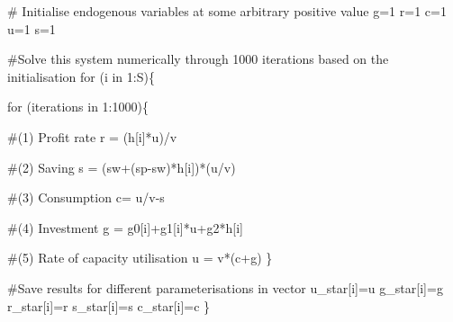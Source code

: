 \documentclass[
  letterpaper,
  DIV=11,
  numbers=noendperiod]{scrreprt}
\newenvironment{Shaded}{\begin{snugshade}}{\end{snugshade}}
\newcommand{\CommentTok}[1]{\textcolor[rgb]{0.37,0.37,0.37}{#1}}
\newcommand{\ControlFlowTok}[1]{\textcolor[rgb]{0.00,0.23,0.31}{#1}}
\newcommand{\DecValTok}[1]{\textcolor[rgb]{0.68,0.00,0.00}{#1}}
\newcommand{\NormalTok}[1]{\textcolor[rgb]{0.00,0.23,0.31}{#1}}
\newcommand{\OtherTok}[1]{\textcolor[rgb]{0.00,0.23,0.31}{#1}}
\newcommand{\SpecialCharTok}[1]{\textcolor[rgb]{0.37,0.37,0.37}{#1}}
\begin{document}
\begin{Shaded}
\begin{Highlighting}[]
\CommentTok{\# Initialise endogenous variables at some arbitrary positive value }
\NormalTok{g}\OtherTok{=}\DecValTok{1}
\NormalTok{r}\OtherTok{=}\DecValTok{1}
\NormalTok{c}\OtherTok{=}\DecValTok{1}
\NormalTok{u}\OtherTok{=}\DecValTok{1}
\NormalTok{s}\OtherTok{=}\DecValTok{1}

\CommentTok{\#Solve this system numerically through 1000 iterations based on the initialisation}
\ControlFlowTok{for}\NormalTok{ (i }\ControlFlowTok{in} \DecValTok{1}\SpecialCharTok{:}\NormalTok{S)\{}
  
  \ControlFlowTok{for}\NormalTok{ (iterations }\ControlFlowTok{in} \DecValTok{1}\SpecialCharTok{:}\DecValTok{1000}\NormalTok{)\{}
    
    \CommentTok{\#(1) Profit rate}
\NormalTok{    r }\OtherTok{=}\NormalTok{ (h[i]}\SpecialCharTok{*}\NormalTok{u)}\SpecialCharTok{/}\NormalTok{v}
    
    \CommentTok{\#(2) Saving}
\NormalTok{    s }\OtherTok{=}\NormalTok{ (sw}\SpecialCharTok{+}\NormalTok{(sp}\SpecialCharTok{{-}}\NormalTok{sw)}\SpecialCharTok{*}\NormalTok{h[i])}\SpecialCharTok{*}\NormalTok{(u}\SpecialCharTok{/}\NormalTok{v)}
    
    \CommentTok{\#(3) Consumption}
\NormalTok{    c}\OtherTok{=}\NormalTok{ u}\SpecialCharTok{/}\NormalTok{v}\SpecialCharTok{{-}}\NormalTok{s}
    
    \CommentTok{\#(4) Investment}
\NormalTok{    g }\OtherTok{=}\NormalTok{ g0[i]}\SpecialCharTok{+}\NormalTok{g1[i]}\SpecialCharTok{*}\NormalTok{u}\SpecialCharTok{+}\NormalTok{g2}\SpecialCharTok{*}\NormalTok{h[i]}
    
    \CommentTok{\#(5) Rate of capacity utilisation}
\NormalTok{    u }\OtherTok{=}\NormalTok{ v}\SpecialCharTok{*}\NormalTok{(c}\SpecialCharTok{+}\NormalTok{g)}
\NormalTok{  \}}
  
  \CommentTok{\#Save results for different parameterisations in vector}
\NormalTok{  u\_star[i]}\OtherTok{=}\NormalTok{u}
\NormalTok{  g\_star[i]}\OtherTok{=}\NormalTok{g}
\NormalTok{  r\_star[i]}\OtherTok{=}\NormalTok{r}
\NormalTok{  s\_star[i]}\OtherTok{=}\NormalTok{s}
\NormalTok{  c\_star[i]}\OtherTok{=}\NormalTok{c}
\NormalTok{\}}
\end{Highlighting}
\end{Shaded}
\end{document}
